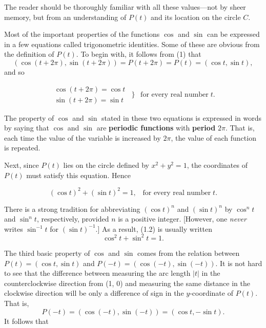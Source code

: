 \noindent The reader should be thoroughly familiar with all these values---not by sheer memory, 
but from an understanding of $P(t)$ and its location on the circle $C$.


Most of the important properties of the functions $\cos$ and $\sin$ can be expressed in a few equations called trigonometric identities. Some of these are obvious from the definition of $P(t)$. To begin with, it follows from (1) that
$$
(\cos(t + 2\pi), \sin(t + 2\pi)) = P(t + 2\pi) = P(t) = (\cos t, \sin t), 
$$
\noindent and so


\begin{theorem} %
$$
\begin{array}{l}
\cos(t + 2\pi) = \cos t \\
\sin(t + 2\pi) = \sin t 
\end{array}
\left\}\;  \mbox{for every real number}\; t.
\right .
$$
\end{theorem}

The property of $\cos$ and $\sin$ stated in these two equations is expressed in words by saying that
$\cos$ and $\sin$ are \textbf{periodic functions} with \textbf{period} $2\pi$. That is, each time the value of the variable is increased by $2\pi$, the value of each function is repeated.

Next, since $P(t)$ lies on the circle defined by $x^2 + y^2 = 1$, the coordinates of $P(t)$ must satisfy this equation. Hence


\begin{theorem} %
$$
(\cos t)^2 + (\sin t)^2 = 1,  \;\;\;\mbox{for every real number}\; t.
$$
\end{theorem}

There is a strong tradition for abbreviating $(\cos t)^n$ and $(\sin t)^n$ by $\cos^{n}t$ and $\sin^{n}t$, respectively, provided $n$ is a positive integer. [However, one \textit{never} writes $\sin^{-1}t$ for $(\sin t)^{-1}$.] As a result, (1.2) is usually written
$$
\cos^{2} t + \sin^{2} t = 1.
$$

The third basic property of $\cos$ and $\sin$ comes from the relation between $P(t) = (\cos t, \sin t)$ and $P(-t) = (\cos(-t), \sin(-t))$. It is not hard to see that the difference between measuring the arc length $|t|$ in the counterclockwise direction from (1, 0) and measuring the same distance in the clockwise direction will be only a difference of sign in the $y$-coordinate of $P(t)$.  That is,
$$
P(-t) = (\cos(-t), \sin(-t)) = (\cos t, -\sin t).
$$
\noindent It follows that 

